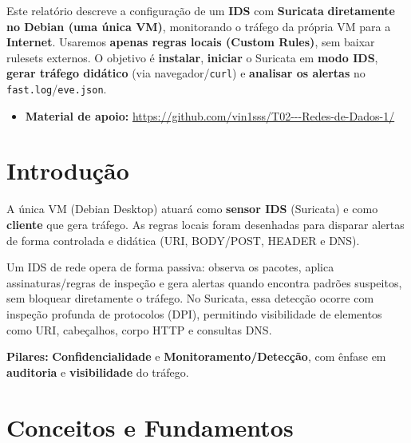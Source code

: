 ﻿




\tableofcontents
\newpage

\noindent
Este relatório descreve a configuração de um \textbf{IDS} com \textbf{Suricata} \textbf{diretamente no Debian (uma única VM)}, monitorando o tráfego da própria VM para a \textbf{Internet}. Usaremos \textbf{apenas regras locais (Custom Rules)}, sem baixar rulesets externos. O objetivo é \textbf{instalar}, \textbf{iniciar} o Suricata em \textbf{modo IDS}, \textbf{gerar tráfego didático} (via navegador/\texttt{curl}) e \textbf{analisar os alertas} no \texttt{fast.log}/\texttt{eve.json}.

\begin{itemize}
  \item \textbf{Material de apoio:} \url{https://github.com/vin1sss/T02---Redes-de-Dados-1/}
\end{itemize}

\section{Introdução}

A única VM (Debian Desktop) atuará como \textbf{sensor IDS} (Suricata) e como \textbf{cliente} que gera tráfego. As regras locais foram desenhadas para disparar alertas de forma controlada e didática (URI, BODY/POST, HEADER e DNS).

Um IDS de rede opera de forma passiva: observa os pacotes, aplica assinaturas/regras de inspeção e gera alertas quando encontra padrões suspeitos, sem bloquear diretamente o tráfego. No Suricata, essa detecção ocorre com inspeção profunda de protocolos (DPI), permitindo visibilidade de elementos como URI, cabeçalhos, corpo HTTP e consultas DNS.

\textbf{Pilares:} \textbf{Confidencialidade} e \textbf{Monitoramento/Detecção}, com ênfase em \textbf{auditoria} e \textbf{visibilidade} do tráfego.

\section{Conceitos e Fundamentos}

